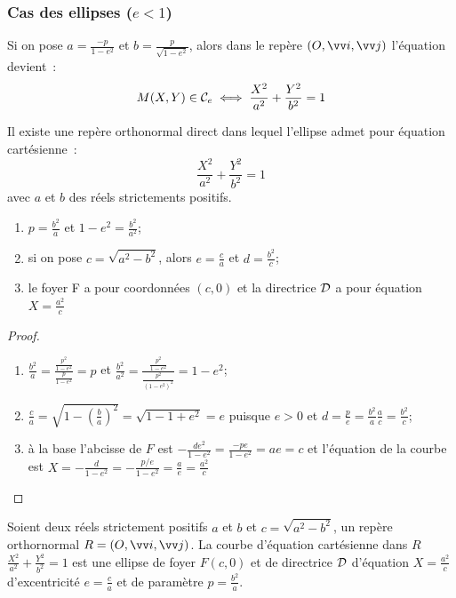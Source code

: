 \subsubsection{Cas des ellipses ($e<1$)}
Si on pose $a=\frac{-p}{1-e^2}$ et $b=\frac{p}{\sqrt{1-e^2}}$, alors dans le repère $\rond$ l'équation devient~:
\begin{equation}
  M(X,Y) \in \mathcal{C}_e \iff \frac{X^2}{a^2}+\frac{Y^2}{b^2}=1
\end{equation}
\begin{theo}
  Il existe une repère orthonormal direct dans lequel l'ellipse admet pour équation cartésienne~:
  \begin{equation}
    \frac{X^2}{a^2}+\frac{Y^2}{b^2}=1
  \end{equation}
  avec $a$ et $b$ des réels strictements positifs.
\end{theo}
\begin{prop}
  \begin{enumerate}
  \item $p=\frac{b^2}{a}$ et $1-e^2=\frac{b^2}{a^2}$;
  \item si on pose $c=\sqrt{a^2-b^2}$, alors $e=\frac{c}{a}$ et $d=\frac{b^2}{c}$;
  \item le foyer F a pour coordonnées $(c,0)$ et la directrice $\mathcal{D}$ a pour équation $X=\frac{a^2}{c}$
  \end{enumerate}
\end{prop}
\begin{proof}
  \begin{enumerate}
  \item $\frac{b^2}{a}=\frac{\frac{p^2}{1-e^2}}{\frac{p}{1-e^2}}=p$ et $\frac{b^2}{a^2}=\frac{\frac{p^2}{1-e^2}}{\frac{p^2}{(1-e^2)^2}}=1-e^2$;
  \item $\frac{c}{a}=\sqrt{1-\left(\frac{b}{a}\right)^2}=\sqrt{1-1+e^2}=e$ puisque $e>0$ et $d=\frac{p}{e}=\frac{b^2}{a} \frac{a}{c}=\frac{b^2}{c}$;
  \item à la base l'abcisse de $F$ est $-\frac{de^2}{1-e^2}=\frac{-pe}{1-e^2}=ae=c$ et l'équation de la courbe est $X=-\frac{d}{1-e^2}=-\frac{p/e}{1-e^2}=\frac{a}{e}=\frac{a^2}{c}$
  \end{enumerate}
\end{proof}
\begin{theo}
  Soient deux réels strictement positifs $a$ et $b$ et $c=\sqrt{a^2-b^2}$, un repère orthornormal $R=\rond$. La courbe d'équation cartésienne dans $R$ $\frac{X^2}{a^2}+\frac{Y^2}{b^2}=1$ est une ellipse de foyer $F(c,0)$ et de directrice $\mathcal{D}$ d'équation $X=\frac{a^2}{c}$ d'excentricité $e=\frac{c}{a}$ et de paramètre $p=\frac{b^2}{a}$.
\end{theo}
